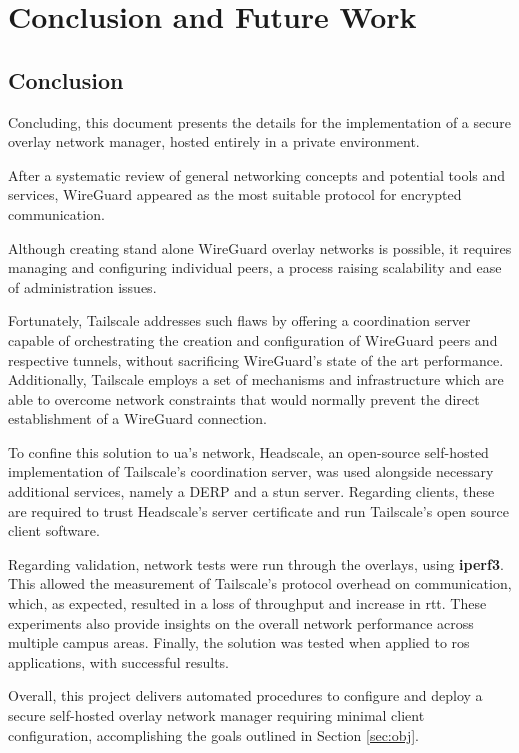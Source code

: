 \documentclass[11pt,twoside,a4paper]{report}
\begin{document}
\chapter{Conclusion and Future Work}

\section{Conclusion}

Concluding, this document presents the details for the implementation of a secure overlay network manager, hosted entirely in a private environment.

After a systematic review of general networking concepts and potential tools and services, WireGuard appeared as the most suitable protocol for encrypted communication.

Although creating stand alone WireGuard overlay networks is possible, it requires managing and configuring individual peers, a process raising scalability and ease of administration issues.

Fortunately, Tailscale addresses such flaws by offering a coordination server capable of orchestrating the creation and configuration of WireGuard peers and respective tunnels, without sacrificing WireGuard's state of the art performance. Additionally, Tailscale employs a set of mechanisms and infrastructure which are able to overcome network constraints that would normally prevent the direct establishment of a WireGuard connection.

To confine this solution to \ac{ua}'s network, Headscale, an open-source self-hosted implementation of Tailscale's coordination server, was used alongside necessary additional services, namely a \ac{DERP} and a \ac{stun} server. Regarding clients, these are required to trust Headscale's server certificate and run Tailscale's open source client software.

Regarding validation, network tests were run through the overlays, using \textbf{iperf3}. This allowed the measurement of Tailscale's protocol overhead on communication, which, as expected, resulted in a loss of throughput and increase in \ac{rtt}. These experiments also provide insights on the overall network performance across multiple campus areas. Finally, the solution was tested when applied to \ac{ros} applications, with successful results.

Overall, this project delivers automated procedures to configure and deploy a secure self-hosted overlay network manager requiring minimal client configuration, accomplishing the goals outlined in Section \ref{sec:obj}.
\end{document}
